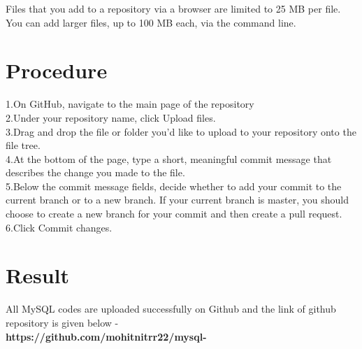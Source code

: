 \documentclass[100pt]{article}
\begin{document}
	Files that you add to a repository via a browser are limited to 25 MB per file. You can add larger files, up to 100 MB each, via the command line.\\

	\section{Procedure}
   1.On GitHub, navigate to the main page of the repository\\
   
   2.Under your repository name, click Upload files.\\
   
   3.Drag and drop the file or folder you'd like to upload to your repository onto the file tree. \\
   
   4.At the bottom of the page, type a short, meaningful commit message that describes the change you made to the file.\\
   
   5.Below the commit message fields, decide whether to add your commit to the current branch or to a new branch. If your current branch is master, you should choose to create a new branch for your commit and then create a pull request.\\
   
   6.Click Commit changes.\\
   
   \section{Result}
  All MySQL codes are uploaded successfully on Github and the link of github repository is given below - \\
   
   \textbf{https://github.com/mohitnitrr22/mysql-}
\end{document}
